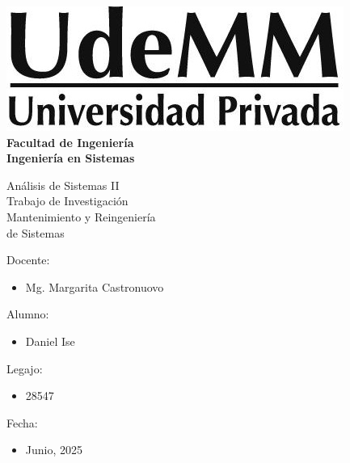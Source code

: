 \begin{titlepage}
    \begin{center}
        \vspace*{.5cm}
        \includegraphics[scale=.5]{../../../img/udemm-logo.png}\\
        \vspace{.2cm}
        \Large
        \textbf{Facultad de Ingeniería}\\
        \textbf{Ingeniería en Sistemas}\\
        \vspace{2cm}

        \Large
        Análisis de Sistemas II \\
        Trabajo de Investigación \\
        \Huge
        Mantenimiento y Reingeniería \\ de Sistemas \\
        \vfill

        \raggedright
        \Large
        Docente:
        \begin{itemize}
            \item[] Mg. Margarita Castronuovo \\
        \end{itemize}
        Alumno:
        \begin{itemize}
            \item[] Daniel Ise
        \end{itemize}
        Legajo:
        \begin{itemize}
            \item[] 28547
        \end{itemize}
        Fecha:
        \begin{itemize}
            \item[] Junio, 2025
        \end{itemize}
    \end{center}
\end{titlepage}
